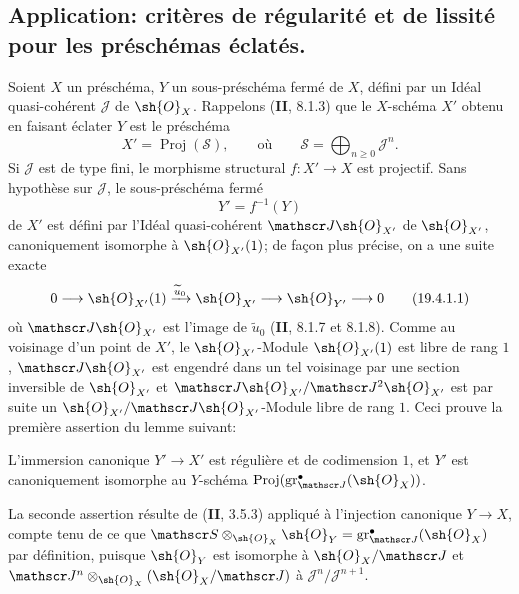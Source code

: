 
\subsection{Application: critères de régularité et de lissité pour les préschémas éclatés.}

\begin{env}[19.4.1]
\label{IV.19.4.1}
Soient $X$ un préschéma, $Y$ un sous-préschéma fermé de $X$, défini par un Idéal quasi-cohérent $\mathscr J$ de $\sh{O}_X$. Rappelons (\textbf{II}, 8.1.3) que le $X$-schéma $X'$ obtenu en faisant éclater $Y$ est le préschéma
\[
  X'=\operatorname{Proj}(\mathscr S),\qquad\text{où}\qquad \mathscr S=\bigoplus_{n\geq0}\mathscr J^n.
\]
Si $\mathscr J$ est de type fini, le morphisme structural $f:X'\to X$ est projectif. Sans hypothèse sur $\mathscr J$, le sous-préschéma fermé
\[
  Y'=f^{-1}(Y)
\]
de $X'$ est défini par l'Idéal quasi-cohérent $\mathscr J\sh{O}_{X'}$ de $\sh{O}_{X'}$, canoniquement isomorphe à $\sh{O}_{X'}(1)$; de façon plus précise, on a une suite exacte
\begin{equation}
  0\longrightarrow\sh{O}_{X'}(1)\xrightarrow{\widetilde u_0}\sh{O}_{X'}\longrightarrow\sh{O}_{Y'}\longrightarrow0
  \tag{19.4.1.1}\label{IV.19.4.1.1}
\end{equation}
où $\mathscr J\sh{O}_{X'}$ est l'image de $\widetilde u_0$ (\textbf{II}, 8.1.7 et 8.1.8). Comme au voisinage d'un point de $X'$, le $\sh{O}_{X'}$-Module $\sh{O}_{X'}(1)$ est libre de rang $1$, $\mathscr J\sh{O}_{X'}$ est engendré dans un tel voisinage par une section inversible de $\sh{O}_{X'}$ et $\mathscr J\sh{O}_{X'}/\mathscr J^2\sh{O}_{X'}$ est par suite un $\sh{O}_{X'}/\mathscr J\sh{O}_{X'}$-Module libre de rang $1$. Ceci prouve la première assertion du lemme suivant:
\end{env}

\begin{lemma}[19.4.2]
\label{IV.19.4.2}
L'immersion canonique $Y'\to X'$ est régulière et de codimension $1$, et $Y'$ est canoniquement isomorphe au $Y$-schéma $\operatorname{Proj}(\operatorname{gr}_{\mathscr J}^\bullet(\sh{O}_X))$.
\end{lemma}

La seconde assertion résulte de (\textbf{II}, 3.5.3) appliqué à l'injection canonique $Y\to X$, compte tenu de ce que $\mathscr S\otimes_{\sh{O}_X}\sh{O}_Y=\operatorname{gr}_{\mathscr J}^\bullet(\sh{O}_X)$ par définition, puisque $\sh{O}_Y$ est isomorphe à $\sh{O}_X/\mathscr J$ et $\mathscr J^n\otimes_{\sh{O}_X}(\sh{O}_X/\mathscr J)$ à $\mathscr J^n/\mathscr J^{n+1}$.

